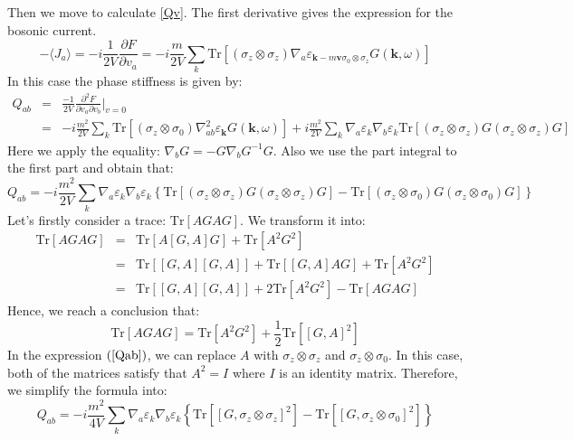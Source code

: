 \documentclass[aps,onecolumn,superscriptaddress,notitlepage,longbibliography]{revtex4-1}
\begin{document}
Then we move to calculate \eqref{Qv}. The first derivative
gives the expression for the bosonic current.
\begin{equation}
  - \langle J_a \rangle = -i\frac{1}{2 V} \frac{\partial F}{\partial v_a} = -
  i\frac{m}{2 V} \sum_k \text{Tr} [(\sigma_z \otimes \sigma_z) \nabla_a
  \varepsilon_{\mathbf{k}- m\mathbf{v} \sigma_0 \otimes \sigma_z} G
  (\mathbf{k}, \omega)]
\end{equation}
In this case the phase stiffness is given by:
\begin{eqnarray}
  Q_{a b} & = & \frac{- 1}{2 V} \frac{\partial^2 F}{\partial v_a \partial v_b}
  |_{v = 0}  \nonumber\\
  & = & -i \frac{m^2}{2 V} \sum_k \text{Tr} [(\sigma_z \otimes \sigma_0)
  \nabla_{a b}^2 \varepsilon_{\mathbf{k}} G (\mathbf{k}, \omega)] +
  i\frac{m^2}{2  V} \sum_k \nabla_a \varepsilon_k \nabla_b \varepsilon_k
  \text{Tr} [(\sigma_z \otimes \sigma_z) G (\sigma_z \otimes \sigma_z) G] 
\end{eqnarray}
Here we apply the equality: $\nabla_b G = - G  \nabla_b G^{- 1} G$. Also we
use the part integral to the first part and obtain that:
\begin{equation}
  Q_{a b} = - i\frac{m^2}{2 V} \sum_k \nabla_a \varepsilon_k \nabla_b
  \varepsilon_k \left\{ \text{Tr} [(\sigma_z \otimes \sigma_z) G (\sigma_z
  \otimes \sigma_z) G] - \text{Tr} [(\sigma_z \otimes \sigma_0) G (\sigma_z
  \otimes \sigma_0) G] \right\} \label{Qab}
\end{equation}
Let's firstly consider a trace: $\text{Tr} [A G A G]$. We transform it into:
\begin{eqnarray}
  \text{Tr} [A G A G] & = & \text{Tr} [A [G, A] G] + \text{Tr} [A^2 G^2]
  \nonumber\\
  & = & \text{Tr} [[G, A] [G, A]] + \text{Tr} [[G, A] A G] + \text{Tr} [A^2
  G^2] \nonumber\\
  & = & \text{Tr} [[G, A] [G, A]] + 2 \text{Tr} [A^2 G^2] - \text{Tr} [A G A
  G] 
\end{eqnarray}
Hence, we reach a conclusion that:
\begin{equation}
  \text{Tr} [A G A G] = \text{Tr} [A^2 G^2] + \frac{1}{2} \text{Tr} [[G, A]^2]
\end{equation}
In the expression $\left( \ref{Qab} \right)$, we can replace $A$ with
$\sigma_z \otimes \sigma_z$ and $\sigma_z \otimes \sigma_0$. In this case,
both of the matrices satisfy that $A^2 =I$ where $I$ is an identity matrix. Therefore, we simplify
the formula into:
\begin{equation}
  Q_{a b} = - i\frac{m^2}{4 V} \sum_k \nabla_a \varepsilon_k \nabla_b
  \varepsilon_k \left\{ \text{Tr} [[G, \sigma_z \otimes \sigma_z]^2] -
  \text{Tr} [[G, \sigma_z \otimes \sigma_0]^2] \right\} \label{Qab2}
\end{equation}
\end{document}
